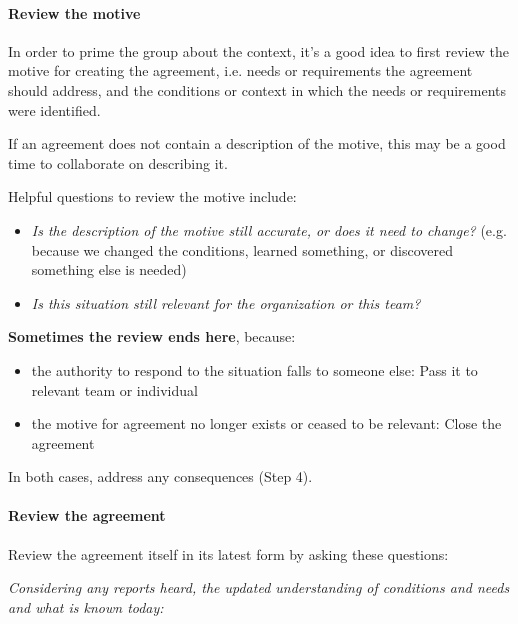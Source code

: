 \paragraph{Review the motive}
\label{reviewthemotive}

In order to prime the group about the context, it's a good idea to first review the motive for creating the agreement, i.e. needs or requirements the agreement should address, and the conditions or context in which the needs or requirements were identified.

If an agreement does not contain a description of the motive, this may be a good time to collaborate on describing it.

Helpful questions to review the motive include:

\begin{itemize}
\item \emph{Is the description of the motive still accurate, or does it need to change?} (e.g. because we changed the conditions, learned something, or discovered something else is needed)

\item \emph{Is this situation still relevant for the organization or this team?}

\end{itemize}

\textbf{Sometimes the review ends here}, because:

\begin{itemize}
\item the authority to respond to the situation falls to someone else: Pass it to relevant team or individual

\item the motive for agreement no longer exists or ceased to be relevant: Close the agreement

\end{itemize}

In both cases, address any consequences (Step 4).

\paragraph{Review the agreement}
\label{reviewtheagreement}

Review the agreement itself in its latest form by asking these questions:

\emph{Considering any reports heard, the updated understanding of conditions and needs and what is known today:}

